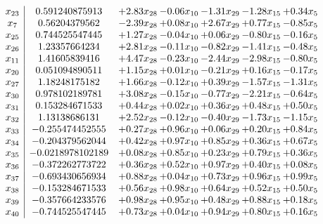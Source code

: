 \documentclass[8pt]{article}
\begin{document}
\[\begin{array}{c| c c@{\hskip 2pt} c@{\hskip 2pt} c@{\hskip 2pt} c@{\hskip 2pt} c@{\hskip 2pt} }
 x_{23}   &  0.591240875913 & +  2.83 x_{28} & -0.06 x_{10} & -1.31 x_{29} & -1.28 x_{15} & +  0.34 x_{5}\\
 x_{7}   &  0.56204379562 & -2.39 x_{28} & +  0.08 x_{10} & +  2.67 x_{29} & +  0.77 x_{15} & -0.85 x_{5}\\
 x_{25}   &  0.744525547445 & +  1.27 x_{28} & -0.04 x_{10} & +  0.06 x_{29} & -0.80 x_{15} & -0.16 x_{5}\\
 x_{26}   &  1.23357664234 & +  2.81 x_{28} & -0.11 x_{10} & -0.82 x_{29} & -1.41 x_{15} & -0.48 x_{5}\\
 x_{11}   &  1.41605839416 & +  4.47 x_{28} & -0.23 x_{10} & -2.44 x_{29} & -2.98 x_{15} & -0.80 x_{5}\\
 x_{20}   &  0.051094890511 & +  1.15 x_{28} & +  0.01 x_{10} & -0.21 x_{29} & +  0.16 x_{15} & -0.17 x_{5}\\
 x_{27}   &  1.18248175182 & +  1.66 x_{28} & -0.12 x_{10} & +  0.39 x_{29} & -1.57 x_{15} & -1.31 x_{5}\\
 x_{30}   &  0.978102189781 & +  3.08 x_{28} & -0.15 x_{10} & -0.77 x_{29} & -2.21 x_{15} & -0.64 x_{5}\\
 x_{31}   &  0.153284671533 & +  0.44 x_{28} & +  0.02 x_{10} & +  0.36 x_{29} & +  0.48 x_{15} & +  0.50 x_{5}\\
 x_{32}   &  1.13138686131 & +  2.52 x_{28} & -0.12 x_{10} & -0.40 x_{29} & -1.73 x_{15} & -1.15 x_{5}\\
 x_{33}   &  -0.255474452555 & +  0.27 x_{28} & +  0.96 x_{10} & +  0.06 x_{29} & +  0.20 x_{15} & +  0.84 x_{5}\\
 x_{34}   &  -0.204379562044 & +  0.42 x_{28} & +  0.97 x_{10} & +  0.85 x_{29} & +  0.36 x_{15} & +  0.67 x_{5}\\
 x_{35}   &  -0.0218978102189 & +  0.08 x_{28} & +  0.85 x_{10} & +  0.23 x_{29} & +  0.79 x_{15} & +  0.36 x_{5}\\
 x_{36}   &  -0.372262773722 & +  0.36 x_{28} & +  0.52 x_{10} & +  0.97 x_{29} & +  0.40 x_{15} & +  0.08 x_{5}\\
 x_{37}   &  -0.693430656934 & +  0.88 x_{28} & +  0.04 x_{10} & +  0.73 x_{29} & +  0.96 x_{15} & +  0.99 x_{5}\\
 x_{38}   &  -0.153284671533 & +  0.56 x_{28} & +  0.98 x_{10} & +  0.64 x_{29} & +  0.52 x_{15} & +  0.50 x_{5}\\
 x_{39}   &  -0.357664233576 & +  0.98 x_{28} & +  0.95 x_{10} & +  0.48 x_{29} & +  0.88 x_{15} & +  0.18 x_{5}\\
 x_{40}   &  -0.744525547445 & +  0.73 x_{28} & +  0.04 x_{10} & +  0.94 x_{29} & +  0.80 x_{15} & +  0.16 x_{5}\\

\end{array}\]
\end{document}
